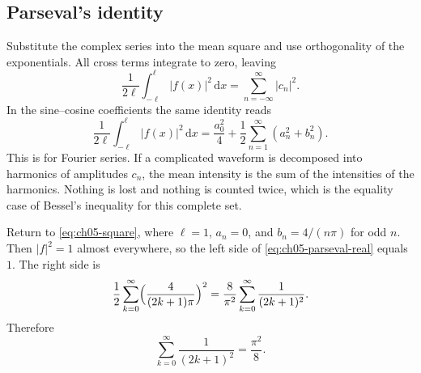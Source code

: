 \subsection{Parseval's identity}

Substitute the complex series into the mean square and use orthogonality of the exponentials. All cross terms integrate to zero, leaving
\begin{equation}
\frac{1}{2\ell}\int_{-\ell}^{\ell}|f(x)|^2\,\mathrm{d}x
=\sum_{n=-\infty}^{\infty}|c_n|^2.
\label{eq:ch05-parseval}
\end{equation}
In the sine--cosine coefficients the same identity reads
\begin{equation}
\frac{1}{2\ell}\int_{-\ell}^{\ell}|f(x)|^2\,\mathrm{d}x
=\frac{a_0^2}{4}+\frac12\sum_{n=1}^{\infty}(a_n^2+b_n^2).
\label{eq:ch05-parseval-real}
\end{equation}
This is  for Fourier series. If a complicated waveform is decomposed into harmonics of amplitudes $c_n$, the mean intensity is the sum of the intensities of the harmonics. Nothing is lost and nothing is counted twice, which is the equality case of Bessel's inequality for this complete set.

\begin{example}
Return to \eqref{eq:ch05-square}, where $\ell=1$, $a_n=0$, and $b_n=4/(n\pi)$ for odd $n$. Then $|f|^2=1$ almost everywhere, so the left side of \eqref{eq:ch05-parseval-real} equals $1$. The right side is
\begin{equation}
\frac12\sum_{k=0}^{\infty}\Bigl(\frac{4}{(2k+1)\pi}\Bigr)^2
=\frac{8}{\pi^2}\sum_{k=0}^{\infty}\frac{1}{(2k+1)^2}.
\end{equation}
Therefore
\begin{equation}
\sum_{k=0}^{\infty}\frac{1}{(2k+1)^2}=\frac{\pi^2}{8}.
\end{equation}
\end{example}

